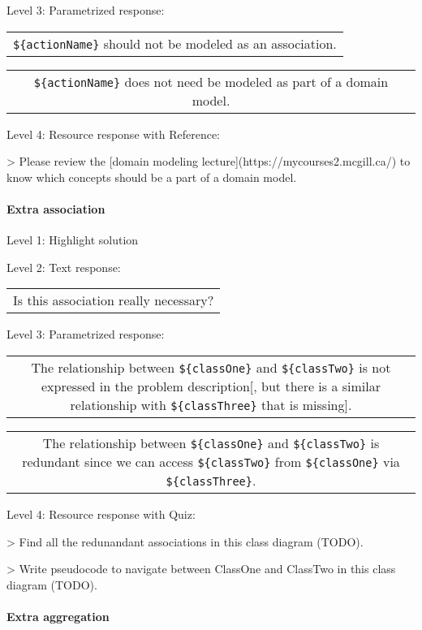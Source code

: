 \noindent Level 3: Parametrized response: \medskip

\begin{tabular}{|c}
\verb|${actionName}| should not be modeled as an association.
\end{tabular} \medskip

\begin{tabular}{|c}
\verb|${actionName}| does not need be modeled as part of a domain model.
\end{tabular} \medskip

\noindent Level 4: Resource response with Reference:

> Please review the [domain modeling lecture](https://mycourses2.mcgill.ca/) to know which concepts should be a part of a domain model.


\paragraph{Extra association}

\noindent Level 1: Highlight solution \medskip

\noindent Level 2: Text response: \medskip

\begin{tabular}{|c}
Is this association really necessary?
\end{tabular} \medskip

\noindent Level 3: Parametrized response: \medskip

\begin{tabular}{|c}
The relationship between \verb|${classOne}| and \verb|${classTwo}| is not expressed in the problem description[, but there is a similar relationship with \verb|${classThree}| that is missing].
\end{tabular} \medskip

\begin{tabular}{|c}
The relationship between \verb|${classOne}| and \verb|${classTwo}| is redundant since we can access \verb|${classTwo}| from \verb|${classOne}| via \verb|${classThree}|.
\end{tabular} \medskip

\noindent Level 4: Resource response with Quiz:

> Find all the redunandant associations in this class diagram (TODO).

> Write pseudocode to navigate between ClassOne and ClassTwo in this class diagram (TODO).


\paragraph{Extra aggregation}

